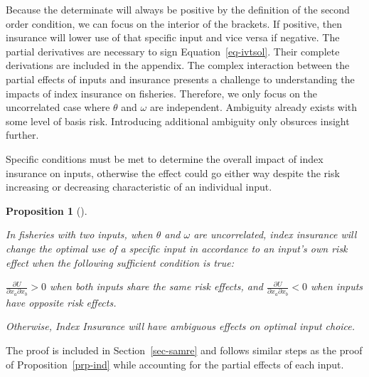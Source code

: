 \documentclass[
  letterpaper,
  DIV=11,
  numbers=noendperiod]{scrartcl}
\theoremstyle{plain}
\newtheorem{proposition}{Proposition}[section]
\theoremstyle{plain}
\theoremstyle{remark}
\begin{document}
Because the determinate will always be positive by the definition of the
second order condition, we can focus on the interior of the brackets. If
positive, then insurance will lower use of that specific input and vice
versa if negative. The partial derivatives are necessary to sign
Equation~\ref{eq-ivtsol}. Their complete derivations are included in the
appendix. The complex interaction between the partial effects of inputs
and insurance presents a challenge to understanding the impacts of index
insurance on fisheries. Therefore, we only focus on the uncorrelated
case where \(\theta\) and \(\omega\) are independent. Ambiguity already
exists with some level of basis risk. Introducing additional ambiguity
only obsurces insight further.

Specific conditions must be met to determine the overall impact of index
insurance on inputs, otherwise the effect could go either way despite
the risk increasing or decreasing characteristic of an individual input.

\begin{proposition}[]\protect\hypertarget{prp-samre}{}\label{prp-samre}

In fisheries with two inputs, when \(\theta\) and \(\omega\) are
uncorrelated, index insurance will change the optimal use of a specific
input in accordance to an input's own risk effect when the following
sufficient condition is true:

\(\frac{\partial U}{\partial x_a\partial x_b}>0\) when both inputs share
the same risk effects, and
\(\frac{\partial U}{\partial x_a\partial x_b}<0\) when inputs have
opposite risk effects.

Otherwise, Index Insurance will have ambiguous effects on optimal input
choice.

\end{proposition}

The proof is included in Section~\ref{sec-samre} and follows similar
steps as the proof of Proposition~\ref{prp-ind} while accounting for the
partial effects of each input.
\end{document}

